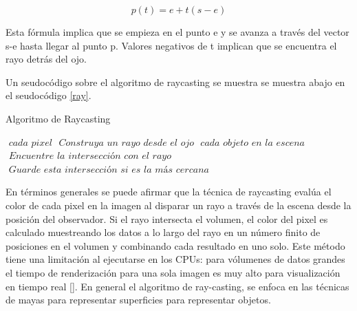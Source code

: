 \begin{equation}
\label{eq:ray_definition}
  p(t) = e+t(s-e)
\end{equation}

Esta fórmula implica que se empieza en el punto e y se avanza a través del vector s-e hasta llegar al punto p. Valores negativos de t implican que se encuentra el rayo detrás del ojo.

Un seudocódigo sobre el algoritmo de raycasting se muestra se muestra abajo en el seudocódigo \ref{ray}.

\begin{algorithm}
\caption{Algoritmo de Raycasting}\label{ray}
\begin{algorithmic}[1]
\For $\textit{ cada pixel}$
\State $\textit{ Construya un rayo desde el ojo}$
\For $\textit{ cada objeto en la escena}$
\State $\textit{ Encuentre la intersección con el rayo}$
\State $\textit{ Guarde esta intersección si es la más cercana}$
\EndFor
\EndFor
\EndProcedure
\end{algorithmic}
\end{algorithm}





En términos generales se puede afirmar que la técnica de raycasting evalúa el color de cada pixel en la imagen al disparar un rayo a través de la escena desde la posición del observador. Si el rayo intersecta el volumen, el color del pixel es calculado muestreando los datos a lo largo del rayo en un número finito de posiciones en el volumen  y combinando cada resultado en uno solo. Este método tiene una limitación al ejecutarse en los CPUs: para vólumenes de datos grandes el tiempo de renderización para una sola imagen es muy alto para visualización en tiempo real [\cite{Marques2009}]. En general el algoritmo de ray-casting, se enfoca en las técnicas de mayas para representar superficies para representar objetos.


